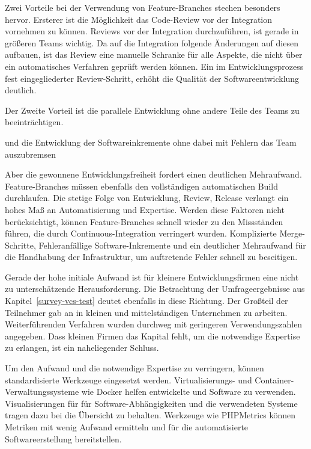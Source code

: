 Zwei Vorteile bei der Verwendung von Feature-Branches stechen besonders hervor. Ersterer ist die Möglichkeit das Code-Review vor der Integration vornehmen zu können. Reviews vor der Integration durchzuführen, ist gerade in größeren Teams wichtig. Da auf die Integration folgende Änderungen auf diesen aufbauen, ist das Review eine manuelle Schranke für alle Aspekte, die nicht über ein automatisches Verfahren geprüft werden können. Ein im Entwicklungsprozess fest eingegliederter Review-Schritt, erhöht die Qualität der Softwareentwicklung deutlich. 

Der Zweite Vorteil ist die parallele Entwicklung ohne andere Teile des Teams zu beeinträchtigen.

 und die Entwicklung der Softwareinkremente ohne dabei mit Fehlern das Team auszubremsen

Aber die gewonnene Entwicklungsfreiheit fordert einen deutlichen Mehraufwand. Feature-Branches müssen ebenfalls den vollständigen automatischen Build durchlaufen. Die stetige Folge von Entwicklung, Review, Release verlangt ein hohes Maß an Automatisierung und Expertise. Werden diese Faktoren nicht berücksichtigt, können Feature-Branches schnell wieder zu den Missständen führen, die durch Continuous-Integration verringert wurden. Komplizierte Merge-Schritte, Fehleranfällige Software-Inkremente und ein deutlicher Mehraufwand für die Handhabung der Infrastruktur, um auftretende Fehler schnell zu beseitigen.

Gerade der hohe initiale Aufwand ist für kleinere Entwicklungsfirmen eine nicht zu unterschätzende Herausforderung. Die Betrachtung der Umfrageergebnisse aus Kapitel~\ref{survey-vcs-test} deutet ebenfalls in diese Richtung. Der Großteil der Teilnehmer gab an in kleinen und mittelständigen Unternehmen zu arbeiten. Weiterführenden Verfahren wurden durchweg mit geringeren Verwendungszahlen angegeben. Dass kleinen Firmen das Kapital fehlt, um die notwendige Expertise zu erlangen, ist ein naheliegender Schluss.

Um den Aufwand und die notwendige Expertise zu verringern, können standardisierte Werkzeuge eingesetzt werden. Virtualisierungs- und Container-Verwaltungssysteme wie Docker helfen entwickelte und Software zu verwenden. Visualisierungen für für Software-Abhängigkeiten und die verwendeten Systeme tragen dazu bei die Übersicht zu behalten. Werkzeuge wie PHPMetrics können Metriken mit wenig Aufwand ermitteln und für die automatisierte Softwareerstellung bereitstellen.




